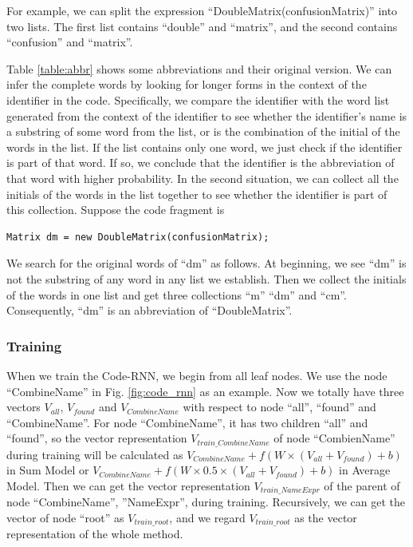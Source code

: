 For example, we can split the expression ``DoubleMatrix(confusionMatrix)''
into two lists. The first list contains ``double'' and ``matrix'',
and the second contains ``confusion'' and ``matrix''.

Table \ref{table:abbr} shows some abbreviations and
their original version. We can infer the complete words by
looking for longer forms in the context of the identifier in the code.
Specifically, we compare the identifier with the word list generated from
the context of the identifier to see whether the identifier's name
is a substring of some word from the list, or is the combination of
the initial of the words in the list.
If the list contains only one word, we just check if the identifier
is part of that word. If so, we conclude that the identifier is the
abbreviation of that word with higher probability.
In the second situation, we can collect all the initials of the words
in the list together to see whether the identifier is part of
this collection. Suppose the code fragment is

\begin{lstlisting}
Matrix dm = new DoubleMatrix(confusionMatrix);
\end{lstlisting}
We search for the original words of ``dm'' as follows.
At beginning, we see ``dm'' is not the substring of any word in any list
we establish. Then we collect the initials of the words in one list and
get three collections ``m'' ``dm'' and ``cm''.
Consequently, ``dm'' is an abbreviation of ``DoubleMatrix''.

\subsubsection{Training}
When we train the Code-RNN, we begin from all leaf nodes. We use the node ``CombineName'' in Fig. \ref{fig:code_rnn} as an example. Now we totally have three vectors $V_{all}$, $V_{found}$ and $V_{CombineName}$ with respect to node ``all'', ``found'' and ``CombineName''. For node ``CombineName'', it has two children ``all'' and ``found'', so the vector representation $V_{train\_CombineName}$ of node ``CombienName'' during training will be calculated as $V_{CombineName} + f(W \times (V_{all} + V_{found}) + b)$ in Sum Model or $V_{CombineName} + f(W \times 0.5 \times (V_{all} + V_{found}) + b)$ in Average Model. Then we can get the vector representation $V_{train\_NameExpr}$ of the parent of node ``CombineName'', ''NameExpr'', during training. Recursively, we can get the vector of node ``root'' as $V_{train\_root}$, and we regard $V_{train\_root}$ as the vector representation of the whole method.

